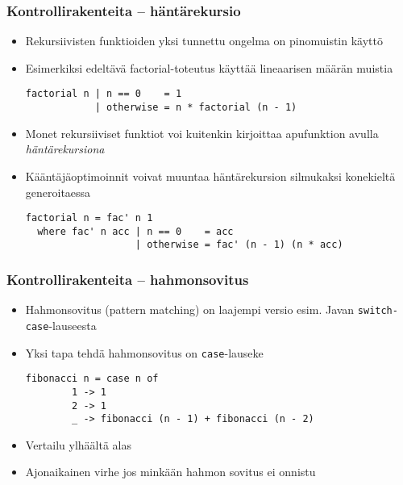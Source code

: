 \documentclass{beamer}
\begin{document}
\begin{frame}[fragile]
\frametitle{Kontrollirakenteita -- häntärekursio}
\begin{itemize}

\item{Rekursiivisten funktioiden yksi tunnettu ongelma on pinomuistin käyttö}
\item{Esimerkiksi edeltävä factorial-toteutus käyttää lineaarisen määrän muistia}
\begin{verbatim}
factorial n | n == 0    = 1
            | otherwise = n * factorial (n - 1)
\end{verbatim}

\item{Monet rekursiiviset funktiot voi kuitenkin kirjoittaa apufunktion avulla \emph{häntärekursiona}}
\item{Kääntäjäoptimoinnit voivat muuntaa häntärekursion silmukaksi konekieltä generoitaessa}
\begin{verbatim}
factorial n = fac' n 1
  where fac' n acc | n == 0    = acc
                   | otherwise = fac' (n - 1) (n * acc)
\end{verbatim}
\end{itemize}
\end{frame}

\begin{frame}[fragile]
\frametitle{Kontrollirakenteita -- hahmonsovitus}

\begin{itemize}

\item{Hahmonsovitus (pattern matching) on laajempi versio esim. Javan \texttt{switch-case}-lauseesta}
\item{Yksi tapa tehdä hahmonsovitus on \texttt{case}-lauseke}
\begin{verbatim}
fibonacci n = case n of
        1 -> 1
        2 -> 1
        _ -> fibonacci (n - 1) + fibonacci (n - 2)
\end{verbatim}

\item{Vertailu ylhäältä alas}
\item{Ajonaikainen virhe jos minkään hahmon sovitus ei onnistu}

\end{itemize}
\end{frame}
\end{document}

